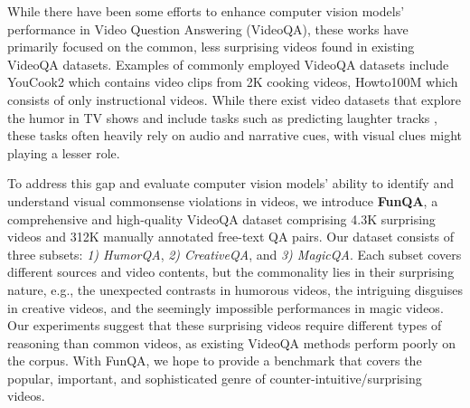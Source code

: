While there have been some efforts to enhance computer vision models' performance in Video Question Answering (VideoQA), these works have primarily focused on the common, less surprising videos found in existing VideoQA datasets. Examples of commonly employed VideoQA datasets include YouCook2 \cite{zhou2018towards} which contains video clips from 2K cooking videos, Howto100M \cite{miech2019howto100m} which consists of only instructional videos.
While there exist video datasets that explore the humor in TV shows \cite{mustard, hasan-etal-2019-ur} and include tasks such as predicting laughter tracks \cite{Patro_2021_WACV}, these tasks often heavily rely on audio and narrative cues, with visual clues might playing a lesser role.

To address this gap and evaluate computer vision models' ability to identify and understand visual commonsense violations in videos, we introduce \textbf{FunQA}, a comprehensive and high-quality VideoQA dataset comprising 4.3K surprising videos and 312K manually annotated free-text QA pairs. Our dataset consists of three subsets: \emph{1) HumorQA}, \emph{2) CreativeQA}, and \emph{3) MagicQA}. Each subset covers different sources and video contents, but the commonality lies in their surprising nature, e.g., the unexpected contrasts in humorous videos, the intriguing disguises in creative videos, and the seemingly impossible performances in magic videos. Our experiments suggest that these surprising videos require different types of reasoning than common videos, as existing VideoQA methods perform poorly on the corpus. With FunQA, we hope to provide a benchmark that covers the popular, important, and sophisticated genre of counter-intuitive/surprising videos. %

